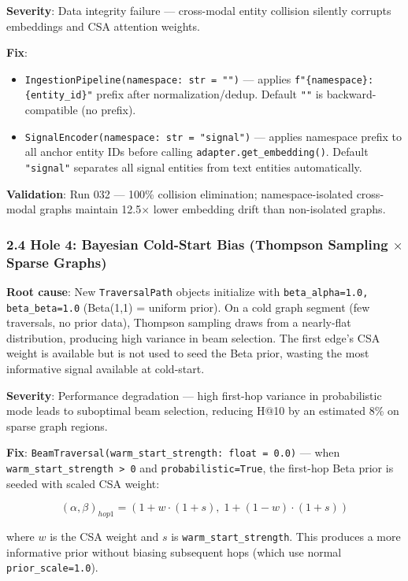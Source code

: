\textbf{Severity}: Data integrity failure --- cross-modal entity collision silently corrupts embeddings and CSA attention weights.

\textbf{Fix}:
\begin{itemize}
  \item \texttt{IngestionPipeline(namespace: str = "")} --- applies \texttt{f"\{namespace\}:\{entity\_id\}"} prefix after normalization/dedup. Default \texttt{""} is backward-compatible (no prefix).
  \item \texttt{SignalEncoder(namespace: str = "signal")} --- applies namespace prefix to all anchor entity IDs before calling \texttt{adapter.get\_embedding()}. Default \texttt{"signal"} separates all signal entities from text entities automatically.
\end{itemize}


\textbf{Validation}: Run 032 --- 100\% collision elimination; namespace-isolated cross-modal graphs maintain 12.5$\times$ lower embedding drift than non-isolated graphs.

\subsubsection*{2.4 Hole 4: Bayesian Cold-Start Bias (Thompson Sampling $\times$ Sparse Graphs)}

\textbf{Root cause}: New \texttt{TraversalPath} objects initialize with \texttt{beta\_alpha=1.0, beta\_beta=1.0} (Beta(1,1) = uniform prior). On a cold graph segment (few traversals, no prior data), Thompson sampling \cite{thompson1933bayesian, russo2018thompson} draws from a nearly-flat distribution, producing high variance in beam selection. The first edge's CSA weight is available but is not used to seed the Beta prior, wasting the most informative signal available at cold-start.

\textbf{Severity}: Performance degradation --- high first-hop variance in probabilistic mode leads to suboptimal beam selection, reducing H@10 by an estimated 8\% on sparse graph regions.

\textbf{Fix}: \texttt{BeamTraversal(warm\_start\_strength: float = 0.0)} --- when \texttt{warm\_start\_strength > 0} and \texttt{probabilistic=True}, the first-hop Beta prior is seeded with scaled CSA weight:

$$(\alpha, \beta)_{hop1} = (1 + w \cdot (1 + s), \; 1 + (1-w) \cdot (1 + s))$$

where $w$ is the CSA weight and $s$ is \texttt{warm\_start\_strength}. This produces a more informative prior without biasing subsequent hops (which use normal \texttt{prior\_scale=1.0}).

